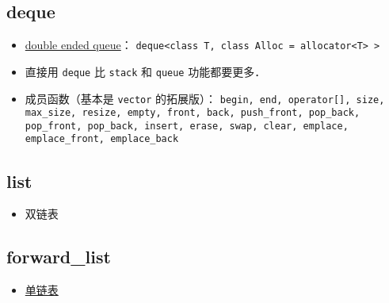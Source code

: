 \subsection{deque}
\begin{itemize}
\item \href{https://cplusplus.com/reference/deque/deque/}{double ended queue}： \verb|deque<class T, class Alloc = allocator<T> >|
\item 直接用 \verb|deque| 比 \verb|stack| 和 \verb|queue| 功能都要更多．
\item 成员函数（基本是 \verb|vector| 的拓展版）： \verb|begin, end, operator[], size, max_size, resize, empty, front, back, push_front, pop_back, pop_front, pop_back, insert, erase, swap, clear, emplace, emplace_front, emplace_back|
\end{itemize}

\subsection{list}
\begin{itemize}
\item 双链表
\end{itemize}

\subsection{forward_list}
\begin{itemize}
\item \href{https://cplusplus.com/reference/forward_list/forward_list/}{单链表}
\end{itemize}
